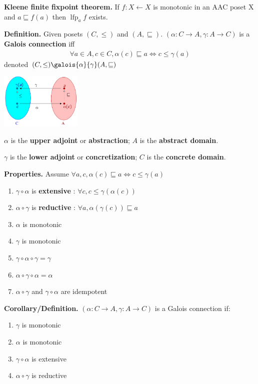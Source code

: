 \documentclass[10pt,landscape]{article}
\begin{document}
\begin{multicols}{3}
\textbf{Kleene finite fixpoint theorem.} If $f : X \leftarrow X$ is monotonic in an AAC poset X and $a \sqsubseteq f(a)$ then $\operatorname{lfp}_a f$ exists.

\textbf{Definition.} Given posets $(C, \leq)$ and $(A, \sqsubseteq)$. $(\alpha : C \rightarrow A, \gamma : A \rightarrow C)$ is a \textbf{Galois connection} iff
\begin{eqnarray*}
  \forall a \in A, c \in C, \alpha (c) \sqsubseteq a \Leftrightarrow c \leq \gamma (a)
\end{eqnarray*}
denoted $(C, \leq) \galois{\alpha}{\gamma} (A, \sqsubseteq)$

\begin{center}
  \includegraphics[height=100px]{figures/galois_connection.png}
\end{center}

$\alpha$ is the \textbf{upper adjoint} or \textbf{abstraction}; $A$ is the \textbf{abstract domain}.

$\gamma$ is the \textbf{lower adjoint} or \textbf{concretization}; $C$ is the \textbf{concrete domain}.

\textbf{Properties.} Assume $\forall a, c, \alpha(c) \sqsubseteq a \Leftrightarrow c \leq \gamma (a)$
\begin{enumerate}\setlength{\itemsep}{-0.7mm}
\item $\gamma \circ \alpha$ is \textbf{extensive} : $\forall c, c \leq \gamma (\alpha (c))$
\item $\alpha \circ \gamma$ is \textbf{reductive} : $\forall a, \alpha (\gamma (c)) \sqsubseteq a$
\item $\alpha$ is monotonic
\item $\gamma$ is monotonic
\item $\gamma \circ \alpha \circ \gamma = \gamma$
\item $\alpha \circ \gamma \circ \alpha = \alpha$
\item $\alpha \circ \gamma$ and $\gamma \circ \alpha$ are idempotent
\end{enumerate}

\textbf{Corollary/Definition.} $(\alpha : C \rightarrow A, \gamma : A \rightarrow C)$ is a Galois connection if:
\begin{enumerate}\setlength{\itemsep}{-0.7mm}
\item $\gamma$ is monotonic
\item $\alpha$ is monotonic
\item $\gamma \circ \alpha$ is extensive
\item $\alpha \circ \gamma$ is reductive
\end{enumerate}


\end{multicols}
\end{document}

